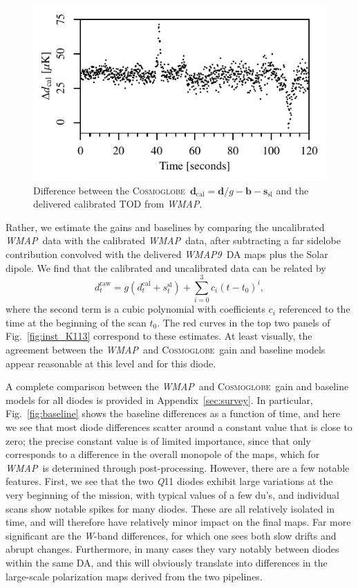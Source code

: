 \documentclass[twocolumn]{../../common/aa}
\def\WMAP{\emph{WMAP}}
\def\WMAPnine{\emph{WMAP9}}
\newcommand{\cosmoglobe}{\textsc{Cosmoglobe}}
\newcommand{\Q}[0]{\textit Q}
\newcommand{\W}[0]{\textit W}
\begin{document}
\begin{figure}
	\includegraphics[width=\columnwidth]{figures/K113_TOD_diff_10min.pdf}
	\caption{Difference between the \cosmoglobe\ $\boldsymbol d_\mathrm{cal}=\boldsymbol d/g-\boldsymbol b - \boldsymbol s_\mathrm{sl}$ and the delivered calibrated TOD from \WMAP.}
	\label{fig:cal_comp_10min}
\end{figure}


Rather, we estimate the gains and baselines by comparing the uncalibrated \WMAP\ data with the calibrated \WMAP\ data, after subtracting a far sidelobe contribution convolved with the delivered \WMAPnine\ DA maps plus the Solar dipole.  We find that the calibrated and uncalibrated data can be related by
\begin{equation}
	d^\mathrm{raw}_t=g(d^\mathrm{cal}_t+s^\mathrm{sl}_t)+\sum_{i=0}^3c_i(t-t_0)^i,
\end{equation}
where the second term is a cubic polynomial with coefficients $c_i$ referenced to the time at the beginning of the scan $t_0$. The red curves in the top two panels of Fig.~\ref{fig:inst_K113} correspond to these estimates. At least visually, the agreement between the \WMAP\ and \cosmoglobe\ gain and baseline models appear reasonable at this level and for this diode.

A complete comparison between the  \WMAP\ and \cosmoglobe\ gain and baseline models for all diodes is provided in Appendix~\ref{sec:survey}. In particular, Fig.~\ref{fig:baseline} shows the baseline differences as a function of time, and here we see that most diode differences scatter around a constant value that is close to zero; the precise constant value is of limited importance, since that only corresponds to a difference in the overall monopole of the maps, which for \WMAP\ is determined through post-processing. However, there are a few notable features. First, we see that the two \Q11 diodes exhibit large variations at the very beginning of the mission, with typical values of a few du's, and individual scans show notable spikes for many diodes. These are all relatively isolated in time, and will therefore have relatively minor impact on the final maps. Far more significant are the \W-band differences, for which one sees both slow drifts and abrupt changes. Furthermore, in many cases they vary notably between diodes within the same DA, and this will obviously translate into differences in the large-scale polarization maps derived from the two pipelines.
\end{document}
